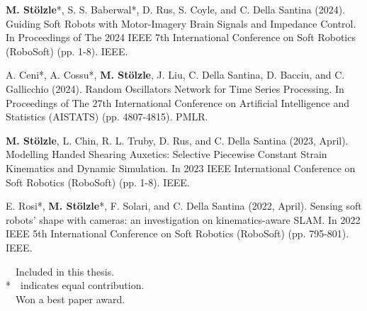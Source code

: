 \begin{itemize}{
  \item[\faFileTextO $\,$ \faTrophy] \textbf{M. Stölzle}*, S. S. Baberwal*, D. Rus, S. Coyle, and C. Della Santina (2024). Guiding Soft Robots with Motor-Imagery Brain Signals and Impedance Control. In Proceedings of The 2024 IEEE 7th International Conference on Soft Robotics (RoboSoft) (pp. 1-8). IEEE.
  \item A. Ceni*, A. Cossu*, \textbf{M. Stölzle}, J. Liu, C. Della Santina, D. Bacciu, and C. Gallicchio (2024). Random Oscillators Network for Time Series Processing. In Proceedings of The 27th International Conference on Artificial Intelligence and Statistics (AISTATS) (pp. 4807-4815). PMLR.
  \item[\faFileTextO] \textbf{M. Stölzle}, L. Chin, R. L. Truby, D. Rus, and C. Della Santina (2023, April). Modelling Handed Shearing Auxetics: Selective Piecewise Constant Strain Kinematics and Dynamic Simulation. In 2023 IEEE International Conference on Soft Robotics (RoboSoft) (pp. 1-8). IEEE.
  \item[\faFileTextO] E. Rosi*, \textbf{M. Stölzle}*, F. Solari, and C. Della Santina (2022, April). Sensing soft robots' shape with cameras: an investigation on kinematics-aware SLAM. In 2022 IEEE 5th International Conference on Soft Robotics (RoboSoft) (pp. 795-801). IEEE.
  }\end{itemize}

\vspace{0.5cm}
\noindent
\faFileTextO~~Included in this thesis.\\
*~~indicates equal contribution.\\
\faTrophy~~Won a best paper award.
